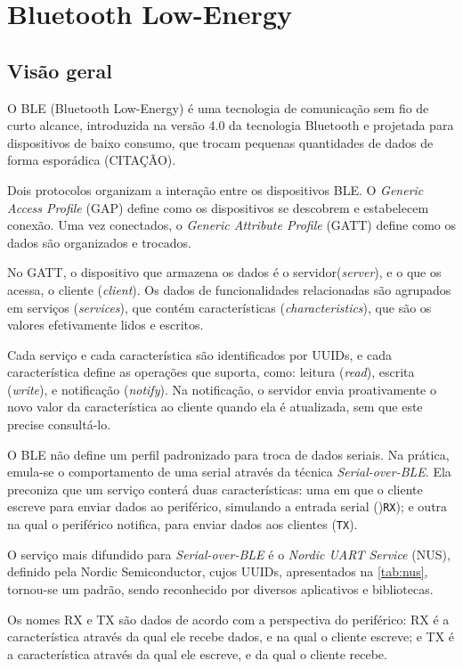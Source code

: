 \section{Bluetooth Low-Energy} \label{sec:BLE}

\subsection{Visão geral}
O BLE (Bluetooth Low-Energy) é uma tecnologia de comunicação sem fio de curto alcance, introduzida na versão 4.0 da tecnologia Bluetooth e projetada para dispositivos de baixo consumo, que trocam pequenas quantidades de dados de forma esporádica (CITAÇÃO). 

Dois protocolos organizam a interação entre os dispositivos BLE. O \textit{Generic Access Profile} (GAP) define como os dispositivos se descobrem e estabelecem conexão. Uma vez conectados, o \textit{Generic Attribute Profile} (GATT) define como os dados são organizados e trocados. 

No GATT, o dispositivo que armazena os dados é o servidor(\textit{server}), e o que os acessa, o cliente (\textit{client}). Os dados de funcionalidades relacionadas são agrupados em serviços (\textit{services}), que contém características (\textit{characteristics}), que são os valores efetivamente lidos e escritos.

Cada serviço e cada característica são identificados por UUIDs, e cada característica define as operações que suporta, como: leitura (\textit{read}), escrita (\textit{write}), e notificação (\textit{notify}). Na notificação, o servidor envia proativamente o novo valor da característica ao cliente quando ela é atualizada, sem que este precise consultá-lo. 

O BLE não define um perfil padronizado para troca de dados seriais. Na prática, emula-se o comportamento de uma serial através da técnica \textit{Serial-over-BLE}. Ela preconiza que um serviço conterá duas características: uma em que o cliente escreve para enviar dados ao periférico, simulando a entrada serial ()\texttt{RX}); e outra na qual o periférico notifica, para enviar dados aos clientes (\texttt{TX}). 

O serviço mais difundido para \textit{Serial-over-BLE} é o \textit{Nordic UART Service} (NUS), definido pela Nordic Semiconductor, cujos UUIDs, apresentados na \autoref{tab:nus}, tornou-se um padrão, sendo reconhecido por diversos aplicativos e bibliotecas.

Os nomes RX e TX são dados de acordo com a perspectiva do periférico: RX é a característica através da qual ele recebe dados, e na qual o cliente escreve; e TX é a característica através da qual ele escreve, e da qual o cliente recebe.

